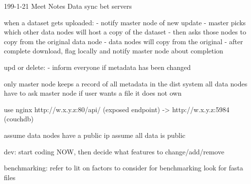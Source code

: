 199-1-21 Meet Notes
Data sync bet servers

when a dataset gets uploaded:
- notify master node of new update
- master picks which other data nodes will host a copy of the dataset
- then asks those nodes to copy from the original data node
- data nodes will copy from the original
- after complete download, flag locally and notify master node about completion

upd or delete:
- inform everyone if metadata has been changed

only master node keeps a record of all metadata in the dist system
all data nodes have to ask master node if user wants a file it does not own

use nginx
http://w.x.y.z:80/api/ (exposed endpoint) -> http://w.x.y.z:5984 (couchdb)

assume data nodes have a public ip
assume all data is public


dev:
start coding NOW, then decide what features to change/add/remove

benchmarking:
refer to lit on factors to consider for benchmarking
look for fasta files